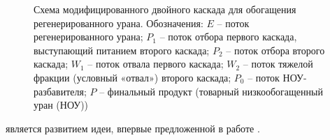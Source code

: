 \begin{figure}[ht]
    \caption{Схема модифицированного двойного каскада для обогащения регенерированного урана. Обозначения: $E$ -- поток регенерированного урана; $P_1$ -- поток отбора первого каскада, выступающий питанием второго каскада; $P_2$ -- поток отбора второго каскада; $W_1$ -- поток отвала первого каскада; $W_2$ -- поток тяжелой фракции (условный «отвал») второго каскада; $P_0$ -- поток НОУ-разбавителя; $P$ -- финальный продукт (товарный низкообогащенный уран (НОУ))}\label{p2left}
\end{figure}

является развитием идеи, впервые предложенной в работе \cite{vodolazskihSposobIzotopnogoVosstanovleniya2006}.

